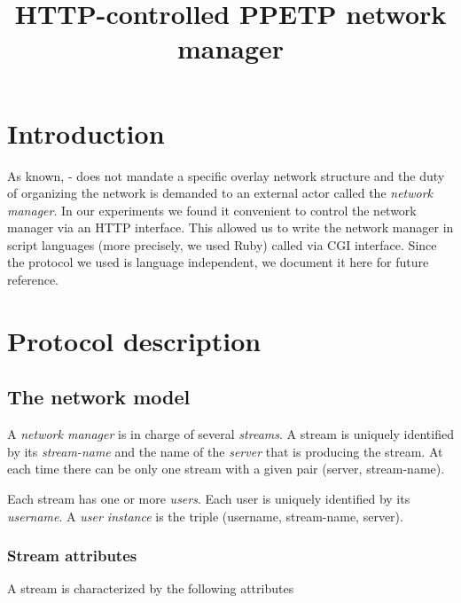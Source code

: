 \documentclass[a4paper,10pt]{medusabook}
\title{HTTP-controlled PPETP network manager}
\author{
\fullname{Riccardo Bernardini}
\organization{DIEGM -- University of Udine}
\address{street=Via delle Scienze, 208;city=Udine;code=33100;country=IT;email=bernardini@uniud.it}}
\begin{document}
\maketitle

\tableofcontents

\chapter{Introduction}
\label{sect:intro;driver}

As known, \ppetp- does not mandate a specific overlay network
structure and the duty of organizing the network is demanded to an
external actor called the \emph{network manager}.  In our experiments
we found it convenient to control the network manager via an HTTP
interface.  This allowed us to write the network manager in script
languages (more precisely, we used Ruby) called via CGI
interface. Since the protocol we used is language independent, we
document it here for future reference.

\chapter{Protocol description}
\label{chap:0;protocol}

\section{The network model}
\label{sect:0.0;protocol}

A \emph{network manager} is in charge of several \emph{streams}.  A
stream is uniquely identified by its \emph{stream-name} and the name of the
\emph{server} that is producing the stream.  At each time there can be
only one stream with a given pair (server, stream-name).

Each stream has one or more \emph{users}.  Each user is uniquely
identified by its \emph{username}.  A \emph{user instance} is the
triple (username, stream-name, server).  

\subsection{Stream attributes}
\label{sub:0.0.0;protocol}

A stream is characterized by the following attributes
\end{document}
